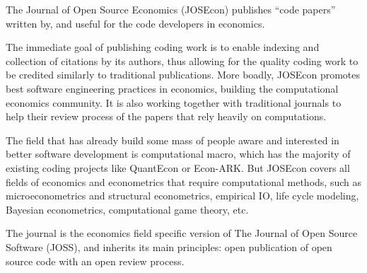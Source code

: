 
The Journal of Open Source Economics (JOSEcon) publishes ``code papers'' written by, 
and useful for the code developers in economics. 

The immediate goal of publishing coding work is to enable indexing and collection of citations by
its authors, thus allowing for the quality coding work to be credited similarly to traditional 
publications.
More boadly, JOSEcon promotes best software engineering practices in economics, 
building the computational economics community. 
It is also working together with traditional journals to help their review process 
of the papers that rely heavily on computations.  

The field that has already build some mass of people aware and interested in better software development is computational macro, which has the majority of existing coding projects like QuantEcon or Econ-ARK.
But JOSEcon covers all fields of economics and econometrics that require computational methods,
such as microeconometrics and structural econometrics, empirical IO, life cycle modeling, Bayesian econometrics, computational game theory, etc. 

The journal is the economics field specific version of The Journal of Open Source Software (JOSS), 
and inherits its main principles: open publication of open source code with an open review process.
